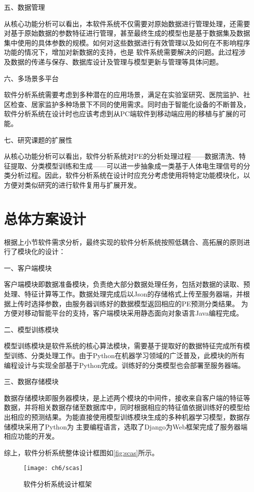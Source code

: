 五、数据管理

从核心功能分析可以看出，本软件系统不仅需要对原始数据进行管理处理，还需要对基于原始数据的参数特征进行管理，甚至最终生成的模型也是基于数据集及数据集中使用的具体参数的规模。如何对这些数据进行有效管理以及如何在不影响程序功能的情况下，增加对新数据的支持，也是
软件系统需要解决的问题。此过程涉及数据的传递与保存、数据库设计及管理与模型更新与管理等具体问题。

六、多场景多平台

软件分析系统需要考虑到多种潜在的应用场景，满足在实验室研究、医院监护、社区检查、居家监护多种场景下不同的使用需求。同时由于智能化设备的不断普及，软件分析系统在设计时也应该考虑到从PC端软件到移动端应用的移植与扩展的可能。

七、研究课题的扩展性

从核心功能分析可以看出，软件分析系统对PE的分析处理过程——数据清洗、特征提取、分类模型训练和生成——可以进一步抽象成一类基于人体电生理信号的分类分析过程。因此，软件分析系统在设计时应充分考虑使用将特定功能模块化，以方便对类似研究的进行软件复用与扩展开发。

\section{总体方案设计}
根据上小节软件需求分析，最终实现的软件分析系统按照低耦合、高拓展的原则进行了模块化的设计：

一、客户端模块

客户端模块即数据准备模块，负责绝大部分数据处理任务，包括对数据的读取、预处理、特征计算等工作。数据处理完成后以Json的存储格式上传至服务器端，并根据上传时选择参数，由服务器训练好的数据模型返回相应的PE预测分类结果。
为方便对移动智能平台的支持，客户端模块采用静态面向对象语言Java编程完成。

二、模型训练模块

模型训练模块是软件系统的核心算法模块，需要基于提取好的数据特征完成所有模型训练、分类处理工作。由于Python在机器学习领域的广泛普及，此模块的所有编程设计与实现全部基于Python完成。训练好的分类模型也会部署至服务器端。

三、数据存储模块

数据存储模块即服务器模块，是上述两个模块的中间件，接收来自客户端的特征等数据，并将相关数据存储至数据库中，同时根据相应的特征值依据训练好的模型给出相应的预测结果。为能直接使用模型训练模块生成的多种机器学习模型，数据存储模块采用了Python为
主要编程语言，选取了Django为Web框架完成了服务器端相应功能的开发。

综上，软件分析系统整体设计框图如\autoref{fig:scas}所示。
\begin{figure}[htbp]
    \centering
    \texttt{[image: ch6/scas]}
    \caption{\label{fig:scas}软件分析系统设计框架}
\end{figure}

